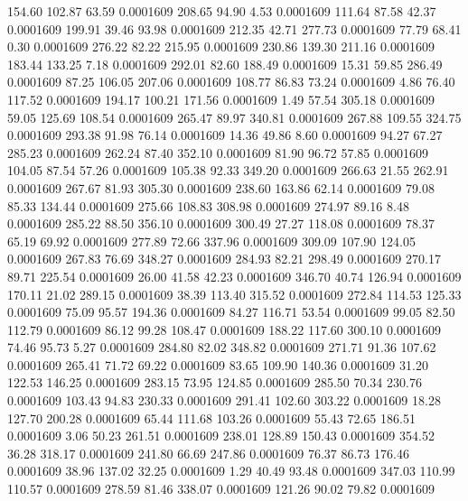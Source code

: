  154.60  102.87   63.59   0.0001609
 208.65   94.90    4.53   0.0001609
 111.64   87.58   42.37   0.0001609
 199.91   39.46   93.98   0.0001609
 212.35   42.71  277.73   0.0001609
  77.79   68.41    0.30   0.0001609
 276.22   82.22  215.95   0.0001609
 230.86  139.30  211.16   0.0001609
 183.44  133.25    7.18   0.0001609
 292.01   82.60  188.49   0.0001609
  15.31   59.85  286.49   0.0001609
  87.25  106.05  207.06   0.0001609
 108.77   86.83   73.24   0.0001609
   4.86   76.40  117.52   0.0001609
 194.17  100.21  171.56   0.0001609
   1.49   57.54  305.18   0.0001609
  59.05  125.69  108.54   0.0001609
 265.47   89.97  340.81   0.0001609
 267.88  109.55  324.75   0.0001609
 293.38   91.98   76.14   0.0001609
  14.36   49.86    8.60   0.0001609
  94.27   67.27  285.23   0.0001609
 262.24   87.40  352.10   0.0001609
  81.90   96.72   57.85   0.0001609
 104.05   87.54   57.26   0.0001609
 105.38   92.33  349.20   0.0001609
 266.63   21.55  262.91   0.0001609
 267.67   81.93  305.30   0.0001609
 238.60  163.86   62.14   0.0001609
  79.08   85.33  134.44   0.0001609
 275.66  108.83  308.98   0.0001609
 274.97   89.16    8.48   0.0001609
 285.22   88.50  356.10   0.0001609
 300.49   27.27  118.08   0.0001609
  78.37   65.19   69.92   0.0001609
 277.89   72.66  337.96   0.0001609
 309.09  107.90  124.05   0.0001609
 267.83   76.69  348.27   0.0001609
 284.93   82.21  298.49   0.0001609
 270.17   89.71  225.54   0.0001609
  26.00   41.58   42.23   0.0001609
 346.70   40.74  126.94   0.0001609
 170.11   21.02  289.15   0.0001609
  38.39  113.40  315.52   0.0001609
 272.84  114.53  125.33   0.0001609
  75.09   95.57  194.36   0.0001609
  84.27  116.71   53.54   0.0001609
  99.05   82.50  112.79   0.0001609
  86.12   99.28  108.47   0.0001609
 188.22  117.60  300.10   0.0001609
  74.46   95.73    5.27   0.0001609
 284.80   82.02  348.82   0.0001609
 271.71   91.36  107.62   0.0001609
 265.41   71.72   69.22   0.0001609
  83.65  109.90  140.36   0.0001609
  31.20  122.53  146.25   0.0001609
 283.15   73.95  124.85   0.0001609
 285.50   70.34  230.76   0.0001609
 103.43   94.83  230.33   0.0001609
 291.41  102.60  303.22   0.0001609
  18.28  127.70  200.28   0.0001609
  65.44  111.68  103.26   0.0001609
  55.43   72.65  186.51   0.0001609
   3.06   50.23  261.51   0.0001609
 238.01  128.89  150.43   0.0001609
 354.52   36.28  318.17   0.0001609
 241.80   66.69  247.86   0.0001609
  76.37   86.73  176.46   0.0001609
  38.96  137.02   32.25   0.0001609
   1.29   40.49   93.48   0.0001609
 347.03  110.99  110.57   0.0001609
 278.59   81.46  338.07   0.0001609
 121.26   90.02   79.82   0.0001609
